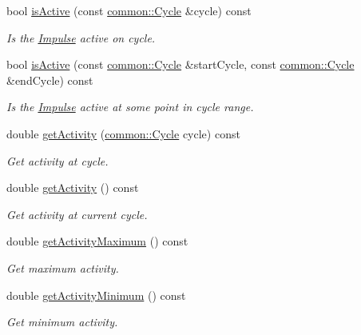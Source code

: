 \begin{DoxyCompactItemize}
bool \hyperlink{classcryomesh_1_1components_1_1Impulse_a69f3c99fcbcaa31682ed42085608e476}{is\-Active} (const \hyperlink{classcryomesh_1_1common_1_1Cycle}{common\-::\-Cycle} \&cycle) const 
\begin{DoxyCompactList}\small\item\em \-Is the \hyperlink{classcryomesh_1_1components_1_1Impulse}{\-Impulse} active on cycle. \end{DoxyCompactList}\item 
bool \hyperlink{classcryomesh_1_1components_1_1Impulse_a07543fdf1e3eb3e2cb8196259fae480a}{is\-Active} (const \hyperlink{classcryomesh_1_1common_1_1Cycle}{common\-::\-Cycle} \&start\-Cycle, const \hyperlink{classcryomesh_1_1common_1_1Cycle}{common\-::\-Cycle} \&end\-Cycle) const 
\begin{DoxyCompactList}\small\item\em \-Is the \hyperlink{classcryomesh_1_1components_1_1Impulse}{\-Impulse} active at some point in cycle range. \end{DoxyCompactList}\item 
double \hyperlink{classcryomesh_1_1components_1_1Impulse_a50ff12cf26ce360c37ec6ed93aad2ea5}{get\-Activity} (\hyperlink{classcryomesh_1_1common_1_1Cycle}{common\-::\-Cycle} cycle) const 
\begin{DoxyCompactList}\small\item\em \-Get activity at cycle. \end{DoxyCompactList}\item 
double \hyperlink{classcryomesh_1_1components_1_1Impulse_a73cb97b2371198e44f726de54c9c36fa}{get\-Activity} () const 
\begin{DoxyCompactList}\small\item\em \-Get activity at current cycle. \end{DoxyCompactList}\item 
double \hyperlink{classcryomesh_1_1components_1_1Impulse_a9607961d67264b1431bc6f0871ab71e0}{get\-Activity\-Maximum} () const 
\begin{DoxyCompactList}\small\item\em \-Get maximum activity. \end{DoxyCompactList}\item 
double \hyperlink{classcryomesh_1_1components_1_1Impulse_a9ccf24929b1d73630bd02ead060a5b15}{get\-Activity\-Minimum} () const 
\begin{DoxyCompactList}\small\item\em \-Get minimum activity. \end{DoxyCompactList}\item 

\end{DoxyCompactItemize}
